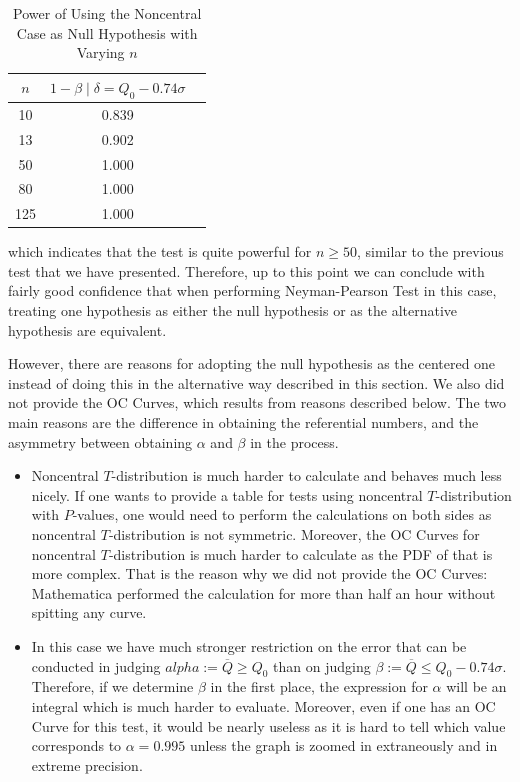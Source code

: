 \documentclass[12pt]{article}
\begin{document}
\begin{table}[htbp]
    \centering
    \begin{tabular}{ccc}
        \toprule
        $n$ & $1-\beta\mid\delta = Q_0 - 0.74\sigma$ \\
        \midrule
        10 & 0.839 \\
        13 & 0.902 \\
        50 & 1.000 \\
        80 & 1.000 \\
        125 & 1.000 \\
        \bottomrule
    \end{tabular}
    \caption{Power of Using the Noncentral Case as Null Hypothesis with Varying $n$}
\end{table}

\noindent which indicates that the test is quite powerful for $n\geq 50$, similar to the previous test that we have presented. Therefore, up to this point we can conclude with fairly good confidence that when performing Neyman-Pearson Test in this case, treating one hypothesis as either the null hypothesis or as the alternative hypothesis are equivalent.

However, there are reasons for adopting the null hypothesis as the centered one instead of doing this in the alternative way described in this section. We also did not provide the OC Curves, which results from reasons described below. The two main reasons are the difference in obtaining the referential numbers, and the asymmetry between obtaining $\alpha$ and $\beta$ in the process. 

\begin{itemize}
    \item Noncentral $T$-distribution is much harder to calculate and behaves much less nicely. If one wants to provide a table for tests using noncentral $T$-distribution with $P$-values, one would need to perform the calculations on both sides as noncentral $T$-distribution is not symmetric. Moreover, the OC Curves for noncentral $T$-distribution is much harder to calculate as the PDF of that is more complex. That is the reason why we did not provide the OC Curves: Mathematica performed the calculation for more than half an hour without spitting any curve.
    \item In this case we have much stronger restriction on the error that can be conducted in judging $alpha := \overline{Q} \geq Q_0$ than on judging $\beta := \overline{Q} \leq Q_0 - 0.74\sigma$. Therefore, if we determine $\beta$ in the first place, the expression for $\alpha$ will be an integral which is much harder to evaluate. Moreover, even if one has an OC Curve for this test, it would be nearly useless as it is hard to tell which value corresponds to $\alpha = 0.995$ unless the graph is zoomed in extraneously and in extreme precision. 
\end{itemize}
\end{document}
